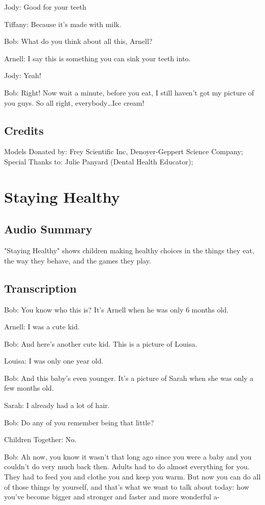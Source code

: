 Jody: Good for your teeth

Tiffany: Because it's made with milk.

Bob: What do you think about all this, Arnell?

Arnell: I say this is something you can sink your teeth into.

Jody: Yeah!

Bob: Right! Now wait a minute, before you eat, I still haven't got my picture of you guys. So all right, everybody\dots Ice cream!

\subsection{Credits}

Models Donated by: Frey Scientific Inc, Denoyer-Geppert Science Company;
Special Thanks to: Julie Panyard (Dental Health Educator);

\section{Staying Healthy}

\subsection{Audio Summary}

"Staying Healthy" shows children making healthy choices in the things they eat, the way they behave, and the games they play.

\subsection{Transcription}

Bob: You know who this is? It's Arnell when he was only 6 months old.

Arnell: I was a cute kid.

Bob: And here's another cute kid. This is a picture of Louisa.

Louisa: I was only one year old.

Bob: And this baby's even younger. It's a picture of Sarah when she was only a few months old.

Sarah: I already had a lot of hair.

Bob: Do any of you remember being that little?

Children Together: No.

Bob: Ah now, you know it wasn't that long ago since you were a baby and you couldn't do very much back then. Adults had to do almost everything for you. They had to feed you and clothe you and keep you warm. But now you can do all of those things by yourself, and that's what we want to talk about today: how you've become bigger and stronger and faster and more wonderful a-

